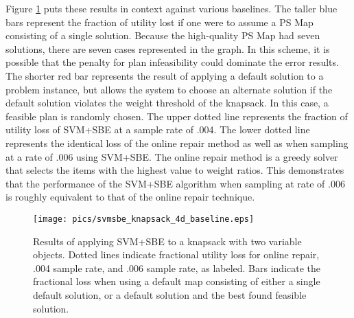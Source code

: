 Figure \ref{fig:svmsbe_knapsack_4d_baseline} puts these results in context against various baselines.  The taller blue bars represent the fraction of utility lost if one were to assume a PS Map consisting of a single solution.  Because the high-quality PS Map had seven solutions, there are seven cases represented in the graph.  In this scheme, it is possible that the penalty for plan infeasibility could dominate the error results.  The shorter red bar represents the result of applying a default solution to a problem instance, but allows the system to choose an alternate solution if the default solution violates the weight threshold of the knapsack. In this case, a feasible plan is randomly chosen.  The upper dotted line represents the fraction of utility loss of SVM+SBE at a sample rate of .004.  The lower dotted line represents the identical loss of the online repair method as well as when sampling at a rate of .006 using SVM+SBE.  The online repair method is a greedy solver that selects the items with the highest value to weight ratios.  This demonstrates that the performance of the SVM+SBE algorithm when sampling at rate of .006 is roughly equivalent to that of the online repair technique.


\begin{figure}
\begin{center}
\texttt{[image: pics/svmsbe\_knapsack\_4d\_baseline.eps]}
\caption{Results of applying SVM+SBE to a knapsack with two variable objects.  Dotted lines indicate fractional utility loss for online repair, .004 sample rate, and .006 sample rate, as labeled.  Bars indicate the fractional loss when using a default map consisting of either a single default solution, or a default solution and the best found feasible solution.}
\label{fig:svmsbe_knapsack_4d_baseline}
\end{center}
\end{figure}







